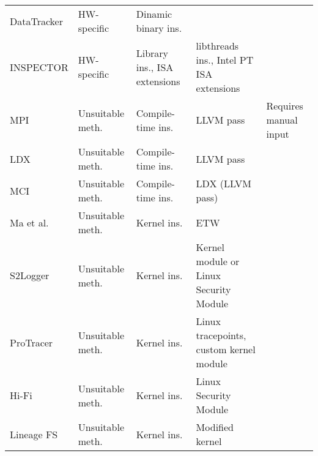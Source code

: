\begin{table}
{\begin{tabular}{p{}p{}p{}p{}p{}}
DataTracker \cite{stamatogiannakis_looking_2015}        & HW-specific      & Dinamic binary ins.                     &                                               &                                                               \\
INSPECTOR                                               & HW-specific      & Library ins., ISA extensions            & libthreads ins., Intel PT ISA extensions      &                                                               \\
MPI\cite{ma_mpi_2017}                                   & Unsuitable meth. & Compile-time ins.                       & LLVM pass                                     & Requires manual input                                         \\
LDX \cite{kwon_ldx_2016}                                & Unsuitable meth. & Compile-time ins.                       & LLVM pass                                     &                                                               \\
MCI \cite{kwon_mci_2018}                                & Unsuitable meth. & Compile-time ins.                       & LDX (LLVM pass)                               &                                                               \\
Ma et al. \cite{ma_accurate_2015}                       & Unsuitable meth. & Kernel ins.                             & ETW                                           &                                                               \\
S2Logger \cite{suen_s2logger_2013}                      & Unsuitable meth. & Kernel ins.                             & Kernel module or Linux Security Module        &                                                               \\
ProTracer \cite{ma_protracer_2016}                      & Unsuitable meth. & Kernel ins.                             & Linux tracepoints, custom kernel module       &                                                               \\
Hi-Fi \cite{pohly_hi-fi_2012}                           & Unsuitable meth. & Kernel ins.                             & Linux Security Module                         &                                                               \\
Lineage FS \cite{sar_lineage_nodate}                    & Unsuitable meth. & Kernel ins.                             & Modified kernel                               &                                                               \\

\end{tabular}}
\end{table}
